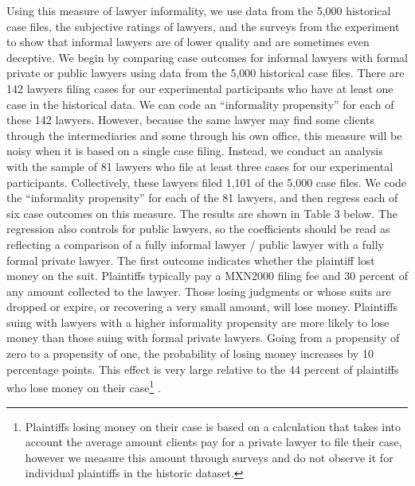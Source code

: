 \documentclass[oneside,12pt]{article}
\begin{document}
Using this measure of lawyer informality, we use data from the 5,000 historical case files, the subjective ratings of lawyers, and the surveys from the experiment to show that informal lawyers are of lower quality and are sometimes even deceptive. We begin by comparing case outcomes for informal lawyers with formal private or public lawyers using data from the 5,000 historical case files. There are 142 lawyers filing cases for our experimental participants who have at least one case in the historical data. We can code an “informality propensity” for each of these 142 lawyers. However, because the same lawyer may find some clients through the intermediaries and some through his own office, this measure will be noisy when it is based on a single case filing. Instead, we conduct an analysis with the sample of 81 lawyers who file at least three cases for our experimental participants. Collectively, these lawyers filed 1,101 of the 5,000 case files. We code the “informality propensity” for each of the 81 lawyers, and then regress each of six case outcomes on this measure. The results are shown in Table 3 below. The regression also controls for public lawyers, so the coefficients should be read as reflecting a comparison of a fully informal lawyer / public lawyer with a fully formal private lawyer. The first outcome indicates whether the plaintiff lost money on the suit. Plaintiffs typically pay a MXN2000 filing fee and 30 percent of any amount collected to the lawyer. Those losing judgments or whose suits are dropped or expire, or recovering a very small amount, will lose money. Plaintiffs suing with lawyers with a higher informality propensity are more likely to lose money than those suing with formal private lawyers. Going from a propensity of zero to a propensity of one, the probability of losing money increases by 10 percentage points. This effect is very large relative to the 44 percent of plaintiffs who lose money on their case\footnote{Plaintiffs losing money on their case is based on a calculation that takes into account the average amount clients pay for a private lawyer to file their case, however we measure this amount through surveys and do not observe it for individual plaintiffs in the historic dataset.} . 
\end{document}
